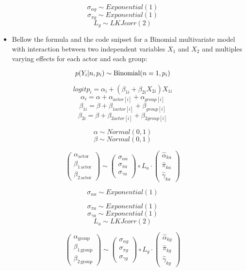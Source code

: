 \documentclass[
  letterpaper,
  DIV=11,
  numbers=noendperiod]{scrreprt}
\providecommand{\tightlist}{%
  \setlength{\itemsep}{0pt}\setlength{\parskip}{0pt}}\usepackage{longtable,booktabs,array}
\begin{document}
\begin{tcolorbox}
\[
\sigma_{\alpha g} \sim Exponential(1)
\] \[
\sigma_{\pi g} \sim Exponential(1) 
\] \[
L_{g} \sim LKJcorr(2)
\]

\begin{itemize}
\tightlist
\item
  Bellow the formula and the code snipset for a Binomial multivariate
  model with interaction between two independent variables \(X_1\) and
  \(X_2\) and multiples varying effects for each actor and each group:
\end{itemize}

\[
p(Y_{i} |n , p_i) \sim \text{Binomial}(n = 1, p_i) \\
\]

\[
logit{p_i}=   \alpha_i + (\beta_{1i}  + \beta_{2i} X_{2i})  X_{1i}
\] \[
\alpha_i = \alpha + \alpha_{actor[i]} + \alpha_{group[i]}
\] \[
\beta_{1i} = \beta + \beta_{1 actor[i]} + \beta_{ group[i]}
\] \[
\beta_{2i} = \beta + \beta_{2 actor[i]} + \beta_{2 group[i]}
\]

\[
\alpha \sim Normal(0,1)
\] \[
\beta \sim Normal(0,1)
\]

\[ 
\begin{pmatrix} 
\alpha_{\text{actor}} \\ 
\beta_{1 \, \text{actor}} \\ 
\beta_{2 \, \text{actor}} 
\end{pmatrix} 
\sim  
\begin{pmatrix} 
\sigma_{\alpha a} \\ 
\sigma_{\pi a} \\ 
\sigma_{\gamma a} 
\end{pmatrix} \circ L_a \cdot 
\begin{pmatrix} 
\widehat{\alpha}_{ka} \\ 
\widehat{\pi}_{ka} \\ 
\widehat{\gamma}_{ka} 
\end{pmatrix} 
\]

\[
\sigma_{\alpha a} \sim Exponential(1) 
\]

\[
\sigma_{\pi a} \sim Exponential(1) 
\] \[
\sigma_{\gamma a} \sim Exponential(1) 
\] \[
L_{a} \sim LKJcorr(2)
\]

\[ 
\begin{pmatrix} 
\alpha_{\text{group}} \\ 
\beta_{1 \, \text{group}} \\ 
\beta_{2 \, \text{group}} 
\end{pmatrix} 
\sim  
\begin{pmatrix} 
\sigma_{\alpha g} \\ 
\sigma_{\pi g} \\ 
\sigma_{\gamma g} 
\end{pmatrix} \circ L_g \cdot 
\begin{pmatrix} 
\widehat{\alpha}_{kg} \\ 
\widehat{\pi}_{kg} \\ 
\widehat{\gamma}_{kg} 
\end{pmatrix} 
\]


\end{tcolorbox}
\end{document}
